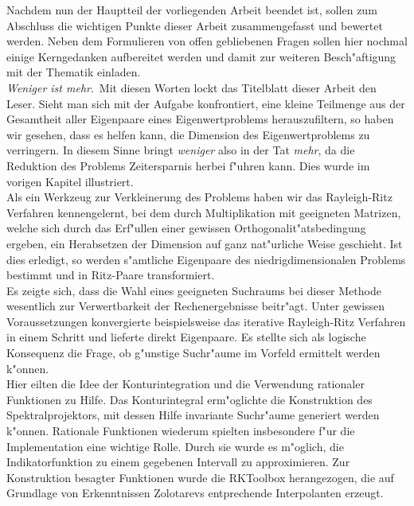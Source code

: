 Nachdem nun der Hauptteil der vorliegenden Arbeit beendet ist, sollen zum Abschluss die wichtigen Punkte dieser Arbeit zusammengefasst und bewertet werden. Neben dem Formulieren von offen gebliebenen Fragen sollen hier nochmal einige Kerngedanken aufbereitet werden und damit zur weiteren Besch"aftigung mit der Thematik einladen.\\

\glqq \emph{Weniger ist mehr}.\grqq\ Mit diesen Worten lockt das Titelblatt dieser Arbeit den Leser. Sieht man sich mit der Aufgabe konfrontiert, eine kleine Teilmenge aus der Gesamtheit aller Eigenpaare eines Eigenwertproblems herauszufiltern, so haben wir gesehen, dass es helfen kann, die Dimension des Eigenwertproblems zu verringern. In diesem Sinne bringt \emph{weniger} also in der Tat \emph{mehr}, da die Reduktion des Problems Zeitersparnis herbei f"uhren kann. Dies wurde im vorigen Kapitel illustriert.\\

Als ein Werkzeug zur Verkleinerung des Problems haben wir das Rayleigh-Ritz Verfahren kennengelernt, bei dem durch Multiplikation mit geeigneten Matrizen, welche sich durch das Erf"ullen einer gewissen Orthogonalit"atsbedingung ergeben, ein Herabsetzen der Dimension auf ganz nat"urliche Weise geschieht. Ist dies erledigt, so werden s"amtliche Eigenpaare des niedrigdimensionalen Problems bestimmt und in Ritz-Paare transformiert.\\

Es zeigte sich, dass die Wahl eines geeigneten Suchraums bei dieser Methode wesentlich zur Verwertbarkeit der Rechenergebnisse beitr"agt. Unter gewissen Voraussetzungen konvergierte beispielsweise das iterative Rayleigh-Ritz Verfahren in einem Schritt und lieferte direkt Eigenpaare. Es stellte sich als logische Konsequenz die Frage, ob g"unstige Suchr"aume im Vorfeld ermittelt werden k"onnen.\\

Hier eilten die Idee der Konturintegration und die Verwendung rationaler Funktionen zu Hilfe. Das Konturintegral erm"oglichte die Konstruktion des Spektralprojektors, mit dessen Hilfe invariante Suchr"aume generiert werden k"onnen. Rationale Funktionen wiederum spielten insbesondere f"ur die Implementation eine wichtige Rolle. Durch sie wurde es m"oglich, die Indikatorfunktion zu einem gegebenen Intervall zu approximieren. Zur Konstruktion besagter Funktionen wurde die RKToolbox herangezogen, die auf Grundlage von Erkenntnissen Zolotarevs entprechende Interpolanten erzeugt.

